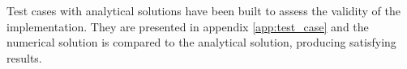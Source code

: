 Test cases with analytical solutions have been built to assess the validity of the implementation. They are presented in appendix \ref{app:test_case} and the numerical solution is compared to the analytical solution, producing satisfying results.
% 
